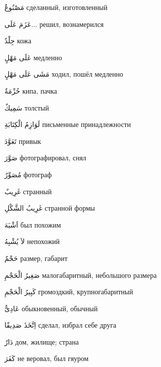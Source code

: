\documentclass[a5paper]{article}
\newcommand\textstyleDropCaps[1]{#1}
\newcommand\textstyleCaptioncharacters[1]{#1}
\begin{document}
\textstyleCaptioncharacters{مَصْنُوعٌ }\textstyleDropCaps{сделанный, изго­товленный‎}

\textstyleCaptioncharacters{عَزَمَ عَلَى... }\textstyleDropCaps{решил, воз­намерился‎}

\textstyleCaptioncharacters{جِلْدٌ }\textstyleDropCaps{кожа‎}

\textstyleCaptioncharacters{عَلَى مَهْلٍ }\textstyleDropCaps{медленно‎}

\textstyleCaptioncharacters{مَشَى عَلَى مَهْلٍ }\textstyleDropCaps{хо­дил, пошёл медленно‎}

\textstyleCaptioncharacters{حُزْمَةٌ }\textstyleDropCaps{кипа, пачка‎}

\textstyleCaptioncharacters{سَمِيكٌ }\textstyleDropCaps{толстый‎}

\textstyleCaptioncharacters{لَوَازِمُ الْكِتَابَةِ }\textstyleDropCaps{письмен­ные принадлежности‎}

\textstyleCaptioncharacters{تَعَوَّدَ }\textstyleDropCaps{привык‎}

\textstyleCaptioncharacters{صَوَّرَ }\textstyleDropCaps{фотографировал, снял‎}

\textstyleCaptioncharacters{مُصَوِّرٌ }\textstyleDropCaps{фотограф‎}

\textstyleCaptioncharacters{غَرِيبٌ }\textstyleDropCaps{странный‎}

\textstyleCaptioncharacters{غَرِيبُ الشَّكْلِ }\textstyleDropCaps{странной формы‎}

\textstyleCaptioncharacters{اَشْبَهَ }\textstyleDropCaps{был похожим‎}

\textstyleCaptioncharacters{لاَ يُشْبِهُ }\textstyleDropCaps{непохожий‎}

\textstyleCaptioncharacters{حَجْمٌ }\textstyleDropCaps{размер, габарит‎}

\textstyleCaptioncharacters{صَغِيرُ الْحَجْمِ }\textstyleDropCaps{малогаба­ритный, небольшого размера‎}

\textstyleCaptioncharacters{كَبِيرُ الْحَجْمِ }\textstyleDropCaps{громозд­кий, крупногабаритный‎}

\textstyleCaptioncharacters{عَادِىٌّ }\textstyleDropCaps{обыкновенный, обычный‎}

\textstyleCaptioncharacters{اِتَّخَذَ صَدِيقًا }\textstyleDropCaps{сделал, из­брал себе друга‎}

\textstyleCaptioncharacters{دَارٌ }\textstyleDropCaps{дом, жилище; страна‎}

\textstyleCaptioncharacters{كَفَرَ }\textstyleDropCaps{не веровал, был гяу­ром‎}
\end{document}
